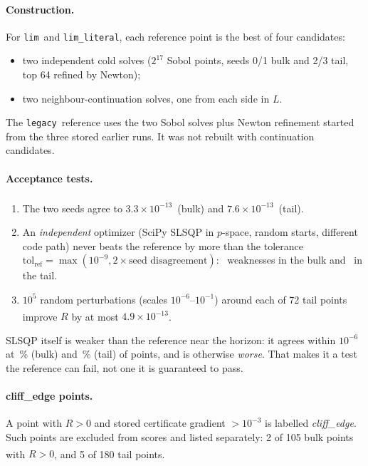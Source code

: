 \documentclass[11pt,a4paper]{article}
\newcommand{\typed}{\textsuperscript{\dag}}
\newcommand{\plim}{\texttt{lim}}
\newcommand{\limlit}{\texttt{lim\_literal}}
\newcommand{\legacy}{\texttt{legacy}}
\begin{document}
\paragraph{Construction.} For \plim\ and \limlit, each reference point is the best of four candidates:
\begin{itemize}
\item two independent cold solves ($2^{17}$ Sobol points, seeds 0/1 bulk and 2/3 tail, top 64 refined by Newton);
\item two neighbour-continuation solves, one from each side in $L$.
\end{itemize}
The \legacy\ reference uses the two Sobol solves plus Newton refinement started from the three stored earlier
runs. It was not rebuilt with continuation candidates.

\paragraph{Acceptance tests.}
\begin{enumerate}
\item The two seeds agree to $3.3\times10^{-13}$\typed\ (bulk) and $7.6\times10^{-13}$\typed\ (tail).
\item An \emph{independent} optimizer (SciPy SLSQP in $p$-space, random starts, different code path) never beats
  the reference by more than the tolerance $\mathrm{tol}_{\mathrm{ref}}=\max(10^{-9},2\times\text{seed
  disagreement})$: \QKDLimXcheckMainWeak\ weaknesses in the bulk and \QKDLimXcheckTailWeak\ in the tail.
\item $10^5$ random perturbations (scales $10^{-6}$--$10^{-1}$) around each of 72 tail points improve $R$ by at
  most $4.9\times10^{-13}$\typed.
\end{enumerate}
SLSQP itself is weaker than the reference near the horizon: it agrees within $10^{-6}$ at
\QKDLimXcheckMainPctAgree\,\% (bulk) and \QKDLimXcheckTailPctAgree\,\% (tail) of points, and is otherwise
\emph{worse}. That makes it a test the reference can fail, not one it is guaranteed to pass.

\paragraph{cliff\_edge points.} A point with $R>0$ and stored certificate gradient $>10^{-3}$ is labelled
\emph{cliff\_edge}. Such points are excluded from scores and listed separately: 2 of 105 bulk points with $R>0$, and
5 of 180 tail points\typed.
\end{document}
